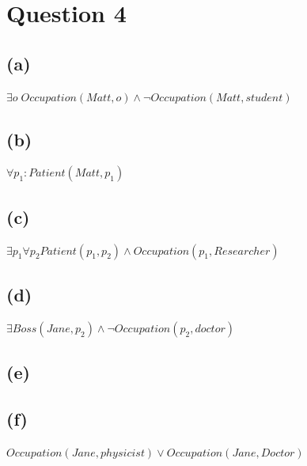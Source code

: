 \documentclass[a4paper]{scrartcl}
\begin{document}
\section*{Question 4}
\subsection*{(a)}
$\exists o\; Occupation(Matt, o) \land \neg Occupation(Matt, student)$


\subsection*{(b)}
$\forall p_1 : Patient(Matt, p_1)$

\subsection*{(c)}
$\exists p_1 \forall p_2 Patient(p_1, p_2) \land Occupation(p_1, Researcher)$


\subsection*{(d)}
$\exists Boss(Jane, p_2) \land \neg Occupation(p_2, doctor)$


\subsection*{(e)}



\subsection*{(f)}
$Occupation(Jane, physicist) \lor Occupation(Jane, Doctor)$
\end{document}
